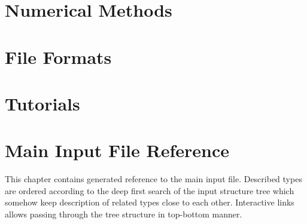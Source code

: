 \documentclass[12pt,a4paper]{report}
\begin{document}










\chapter{Numerical Methods}
\label{chapter:numerical}






%


\chapter{File Formats}
\label{chapter:file-formats}






%  
% 
%  

\chapter{Tutorials}\label{chapter:tutorials}


\chapter{Main Input File Reference}
\label{chapter:input-tree-reference}
This chapter contains generated reference to the main input file. Described types are ordered according to the 
deep first search of the input structure tree which somehow keep description of related types close to each other.
Interactive links allows passing through the tree structure in top-bottom manner. 
\end{document}
